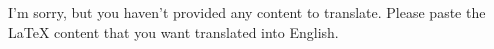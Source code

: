 I'm sorry, but you haven't provided any content to translate. Please paste the LaTeX content that you want translated into English.
